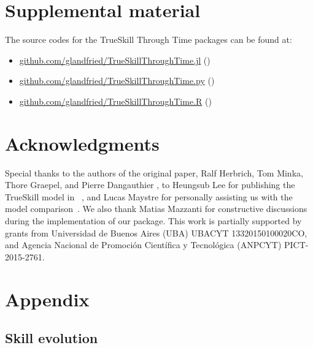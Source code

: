 \documentclass[article]{jss}
\begin{document}
\section*{Supplemental material}

The source codes for the TrueSkill Through Time packages can be found at:
\begin{itemize}
\item \href{github.com/glandfried/TrueSkillThroughTime.jl}{\url{github.com/glandfried/TrueSkillThroughTime.jl}} ()
\item \href{github.com/glandfried/TrueSkillThroughTime.py}{\url{github.com/glandfried/TrueSkillThroughTime.py}}  ()
\item \href{github.com/glandfried/TrueSkillThroughTime.R}{\url{github.com/glandfried/TrueSkillThroughTime.R}}  ()
\end{itemize}

\section*{Acknowledgments}

Special thanks to the authors of the original paper, Ralf Herbrich, Tom Minka, Thore Graepel, and Pierre Dangauthier \citep{Herbrich2007, Dangauthier2007}, to Heungsub Lee for publishing the TrueSkill model in ~\citep{Lee2012}, and Lucas Maystre for personally assisting us with the model comparison~\citep{Maystre2019}. 
We also thank Matias Mazzanti for constructive discussions during the implementation of our package. 
This work is partially supported by grants from Universidad de Buenos Aires (UBA) UBACYT 13320150100020CO, and Agencia Nacional de Promoci\'on Cient\'ifica y Tecnol\'ogica (ANPCYT) PICT-2015-2761.



\newpage
\section{Appendix} \label{app:technical}

\subsection{Skill evolution}\label{sec:appendix_skill_evolution}
\end{document}
